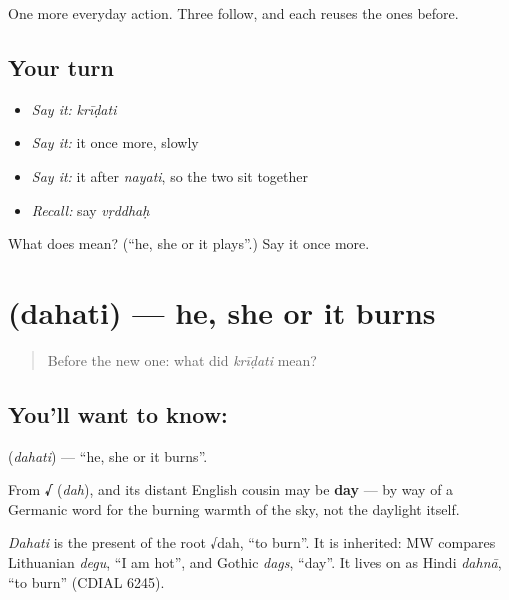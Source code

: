 \begin{grammarlens}[title={What you've built}]
One more everyday action. Three follow, and each reuses the ones before.
\end{grammarlens}

\subsection*{Your turn}
\begin{itemize}
\raggedright
  \item \emph{Say it:} \emph{krīḍati}
  \item \emph{Say it:} it once more, slowly
  \item \emph{Say it:} it after \emph{nayati}, so the two sit together
  \item \emph{Recall:} say \emph{vṛddhaḥ}
\end{itemize}

\begin{tcolorbox}[breakable,colback=teal!4,colframe=teal!35!black,title={Before you move on}]
What does  mean? (\textquotedblleft{}he, she or it plays\textquotedblright{}.) Say it once more.
\end{tcolorbox}
\section[\texorpdfstring{\sk{दहति} (dahati)}{दहति (dahati)}]{ (dahati) — he, she or it burns}

\label{lesson:SA-C22-burn}



\begin{quote}
Before the new one: what did \emph{krīḍati} mean?
\end{quote}

\subsection*{You'll want to know: }
\textbf{} (\emph{dahati}) — \textquotedblleft{}he, she or it burns\textquotedblright{}.

From \textbf{√} (\emph{dah}), and its distant English cousin may be \textbf{day} — by way of a Germanic word for the burning warmth of the sky, not the daylight itself.

\begin{cousinweb}
\emph{Dahati} is the present of the root √dah, \textquotedblleft{}to burn\textquotedblright{}. It is inherited: MW compares Lithuanian \emph{degu}, \textquotedblleft{}I am hot\textquotedblright{}, and Gothic \emph{dags}, \textquotedblleft{}day\textquotedblright{}. It lives on as Hindi \emph{dahnā}, \textquotedblleft{}to burn\textquotedblright{} (CDIAL 6245).
\end{cousinweb}

